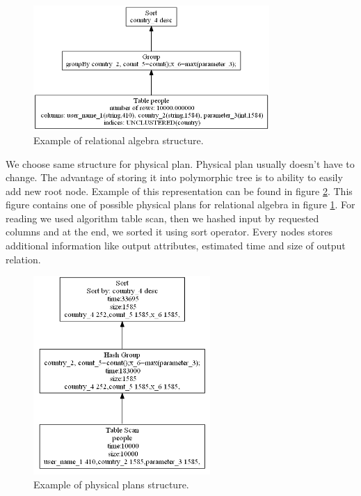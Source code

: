\begin{figure}[h!]
  \centering
    \includegraphics[width=0.8\textwidth]{groupalgebra}

      \caption{Example of relational algebra structure.}
          \label{fig:groupalgebra}
\end{figure}

We choose same structure for physical plan. Physical plan usually doesn't have to change. The advantage of storing it into polymorphic tree is to ability to easily add new root node. Example of this representation can be found in figure \ref{fig:groupplan}. This figure contains one of possible physical plans for relational algebra in figure  \ref{fig:groupalgebra}. For reading we used algorithm table scan, then we hashed input by requested columns and at the end, we sorted it using sort operator. Every nodes stores additional information like output attributes, estimated time and size of output relation.

\begin{figure}[h!]
  \centering
    \includegraphics[width=0.6\textwidth]{groupplan}

      \caption{Example of physical plans structure.}
          \label{fig:groupplan}
\end{figure}


